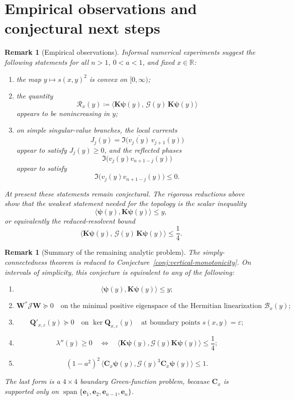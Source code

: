 \documentclass[11pt]{article}
\newtheorem{remark}[theorem]{Remark}
\begin{document}
\section{Empirical observations and conjectural next steps}

\begin{remark}[Empirical observations]\label{rem:numerics}
Informal numerical experiments suggest the following statements for all \(n>1\), \(0<a<1\), and fixed \(x\in\mathbb R\):
\begin{enumerate}
\item the map \(y\mapsto s(x,y)^2\) is convex on \([0,\infty)\);
\item the quantity
\[
\mathcal R_x(y)\coloneqq \bigl\langle \mathbf K\boldsymbol{\psi}(y),\,\mathcal G(y)\,\mathbf K\boldsymbol{\psi}(y)\bigr\rangle
\]
appears to be nonincreasing in \(y\);
\item on simple singular-value branches, the local currents
\[
J_j(y)=\Im\!\bigl(\overline{v_j(y)}\,v_{j+1}(y)\bigr)
\]
appear to satisfy \(J_j(y)\ge 0\), and the reflected phases
\[
\Im\!\bigl(v_j(y)v_{n+1-j}(y)\bigr)
\]
appear to satisfy
\[
\Im\!\bigl(v_j(y)v_{n+1-j}(y)\bigr)\le 0.
\]
\end{enumerate}
At present these statements remain conjectural. The rigorous reductions above show that the weakest statement needed for the topology is the scalar inequality
\[
\langle \boldsymbol{\psi}(y),\mathbf K\boldsymbol{\psi}(y)\rangle\le y,
\]
or equivalently the reduced-resolvent bound
\[
\bigl\langle \mathbf K\boldsymbol{\psi}(y),\,\mathcal G(y)\,\mathbf K\boldsymbol{\psi}(y)\bigr\rangle\le \frac14.
\]
\end{remark}

\begin{remark}[Summary of the remaining analytic problem]
The simply-connectedness theorem is reduced to Conjecture~\ref{conj:vertical-monotonicity}. On intervals of simplicity, this conjecture is equivalent to any of the following:
\begin{enumerate}
\item
\[
\langle \boldsymbol{\psi}(y),\mathbf K\boldsymbol{\psi}(y)\rangle\le y;
\]
\item
\[
\mathbf W^*\mathcal J\mathbf W\succeq 0
\quad\text{on the minimal positive eigenspace of the Hermitian linearization }\mathcal B_x(y);
\]
\item
\[
\mathbf Q'_{x,\varepsilon}(y)\succeq 0
\quad\text{on }\ker \mathbf Q_{x,\varepsilon}(y)
\quad\text{at boundary points }s(x,y)=\varepsilon;
\]
\item
\[
\lambda''(y)\ge 0
\quad\Longleftrightarrow\quad
\bigl\langle \mathbf K\boldsymbol{\psi}(y),\mathcal G(y)\mathbf K\boldsymbol{\psi}(y)\bigr\rangle\le \frac14;
\]
\item
\[
(1-a^2)^2\,
\bigl\langle \mathbf C_x\boldsymbol{\psi}(y),\mathcal G(y)^3\mathbf C_x\boldsymbol{\psi}(y)\bigr\rangle\le 1.
\]
\end{enumerate}
The last form is a \(4\times4\) boundary Green-function problem, because \(\mathbf C_x\) is supported only on \(\operatorname{span}\{\mathbf e_1,\mathbf e_2,\mathbf e_{n-1},\mathbf e_n\}\).
\end{remark}
\end{document}
